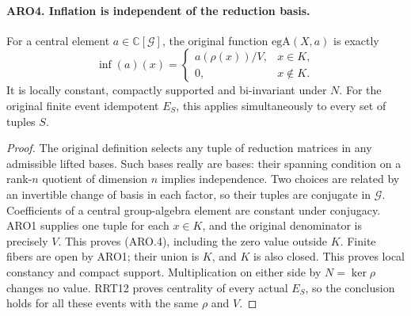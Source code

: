 \paragraph{ARO4. Inflation is independent of the reduction basis.}
\label{claim:ARO4}
For a central element \(a\in\mathbb C[\mathcal G]\), the original
function \(\mathrm{egA}(X,a)\) is exactly
\[
 \operatorname{inf}(a)(x)=
 \begin{cases}a(\rho(x))/V,&x\in K,\\0,&x\notin K.\end{cases}
 \tag{ARO.4}
\]
It is locally constant, compactly supported and bi-invariant under
\(N\).  For the original finite event idempotent \(E_S\), this
applies simultaneously to every set of tuples \(S\).
\begin{proof}
The original definition selects any tuple of reduction matrices in
any admissible lifted bases.  Such bases really are bases: their
spanning condition on a rank-\(n\) quotient of dimension \(n\)
implies independence.  Two choices are related by an invertible
change of basis in each factor, so their tuples are conjugate in
\(\mathcal G\).  Coefficients of a central group-algebra element are
constant under conjugacy.  ARO1 supplies one tuple for each \(x\in K\),
and the original denominator is precisely \(V\).  This proves
(ARO.4), including the zero value outside \(K\).
Finite fibers are open by ARO1; their union is \(K\), and \(K\)
is also closed.  This proves local constancy and compact support.
Multiplication on either side by \(N=\ker\rho\) changes no value.
RRT12 proves centrality of every actual \(E_S\), so the conclusion
holds for all these events with the same \(\rho\) and \(V\).
\end{proof}

